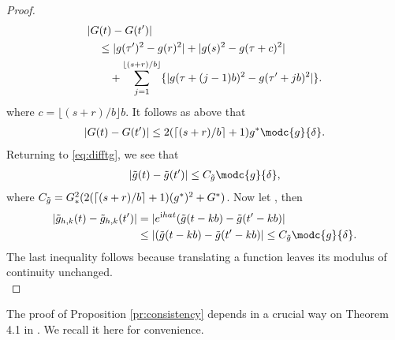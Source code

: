 \begin{appendices}
\begin{proof}
\begin{align}
  &\vert G(t) - G(t') \vert \notag \\
  &\quad \le \vert g(\tau')^2 - g(r)^2\vert +   \vert g(s)^2 - g(\tau + c)^2 \vert\notag \\
  &\qquad +\sum_{j = 1}^{\lfloor (s + r)/b \rfloor} \{\vert g(\tau + (j-1) b)^2 - g(\tau' + j b)^2\vert\}.  \notag
  \label{}
\end{align}
where $c = \lfloor (s + r)/b \rfloor b $. It follows as above that 
\begin{align}
\vert G(t) - G(t') \vert \le 2 (\lceil (s + r)/b\rceil +1)g^*\modc{g}{\delta}.
\end{align}
Returning to \eqref{eq:difftg}, we see that
\begin{align}
  \vert \tg(t) - \tg(t')\vert \le C_{\tg} \modc{g}{\delta},\notag
  \label{}
\end{align}
where $C_{\tilde{g}} = G_*^2(2 (\lceil (s + r)/b\rceil +1)(g^*)^2 + G^*)$. Now let \hkints, then
\begin{align}
  \vert \tghk(t) - \tghk(t')\vert & = \vert e^{\i h a t} (\tg(t - kb) -\tg(t'-kb) \vert\notag\\
  &\le \vert (\tg(t - kb) -\tg(t'-kb) \vert \le C_{\tg} \modc{g}{\delta}.
  \label{}
\end{align}
The last inequality follows because translating a function leaves its modulus of continuity unchanged.\\
\end{proof}
The proof of Proposition \eqref{pr:consistency} depends in a crucial  way on Theorem 4.1 in \cite{Zhang2008}. We recall it here for convenience.


\end{appendices}
